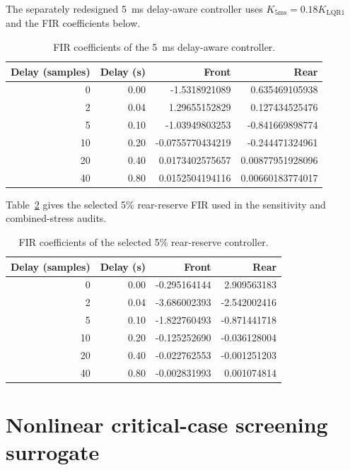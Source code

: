\documentclass[10pt,a4paper]{article}
\begin{document}
The separately redesigned \SI{5}{ms} delay-aware controller uses
$K_{5\mathrm{ms}}=0.18K_{\mathrm{LQR1}}$ and the FIR coefficients below.
\begin{table}[htbp]
\centering\small
\caption{FIR coefficients of the \SI{5}{ms} delay-aware controller.}
\label{tab:supp-delay-aware-coefficients}
\begin{tabular}{rrrr}
\toprule
Delay (samples) & Delay (s) & Front & Rear\\
\midrule
0  & 0.00 & -1.5318921089    &  0.635469105938\\
2  & 0.04 &  1.29655152829   &  0.127434525476\\
5  & 0.10 & -1.03949803253   & -0.841669898774\\
10 & 0.20 & -0.0755770434219 & -0.244471324961\\
20 & 0.40 &  0.0173402575657 &  0.00877951928096\\
40 & 0.80 &  0.0152504194116 &  0.00660183774017\\
\bottomrule
\end{tabular}
\end{table}

Table~\ref{tab:supp-reserve-coefficients} gives the selected 5\% rear-reserve FIR used in the sensitivity and combined-stress audits.
\begin{table}[htbp]
\centering\small
\caption{FIR coefficients of the selected 5\% rear-reserve controller.}
\label{tab:supp-reserve-coefficients}
\begin{tabular}{rrrr}
\toprule
Delay (samples) & Delay (s) & Front & Rear\\
\midrule
0  & 0.00 & -0.295164144 &  2.909563183\\
2  & 0.04 & -3.686002393 & -2.542002416\\
5  & 0.10 & -1.822760493 & -0.871441718\\
10 & 0.20 & -0.125252690 & -0.036128004\\
20 & 0.40 & -0.022762553 & -0.001251203\\
40 & 0.80 & -0.002831993 &  0.001074814\\
\bottomrule
\end{tabular}
\end{table}

\section{Nonlinear critical-case screening surrogate}
\end{document}
